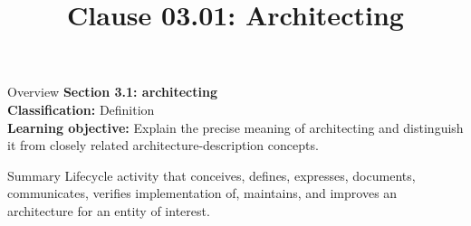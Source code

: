 \documentclass[10pt,letterpaper]{article}
\title{Clause 03.01: Architecting}
\author{}
\date{}
\begin{document}
\maketitle
\begin{CornellOverviewBox}{Overview}
{\Large\bfseries\textcolor{CNavy}{Section 3.1: architecting}}\\[3pt]
{\small\textbf{Classification:} Definition}\\
{\small\textbf{Learning objective:} Explain the precise meaning of architecting and distinguish it from closely related architecture-description concepts.}
\end{CornellOverviewBox}
\vspace{3pt}

\begin{CornellNotesTable}
\end{CornellNotesTable}


\begin{CornellSummaryBox}{Summary}
Lifecycle activity that conceives, defines, expresses, documents, communicates, verifies implementation of, maintains, and improves an architecture for an entity of interest.
\end{CornellSummaryBox}
\end{document}
